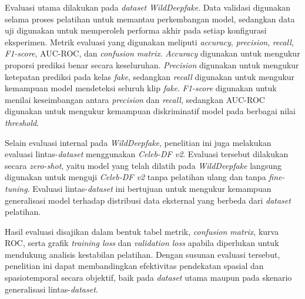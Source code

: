 Evaluasi utama dilakukan pada \textit{dataset} \textit{WildDeepfake}. Data validasi digunakan selama proses pelatihan untuk memantau perkembangan model, sedangkan data uji digunakan untuk memperoleh performa akhir pada setiap konfigurasi eksperimen. Metrik evaluasi yang digunakan meliputi \textit{accuracy}, \textit{precision}, \textit{recall}, \textit{F1-score}, AUC-ROC, dan \textit{confusion matrix}. \textit{Accuracy} digunakan untuk mengukur proporsi prediksi benar secara keseluruhan. \textit{Precision} digunakan untuk mengukur ketepatan prediksi pada kelas \textit{fake}, sedangkan \textit{recall} digunakan untuk mengukur kemampuan model mendeteksi seluruh klip \textit{fake}. \textit{F1-score} digunakan untuk menilai keseimbangan antara \textit{precision} dan \textit{recall}, sedangkan AUC-ROC digunakan untuk mengukur kemampuan diskriminatif model pada berbagai nilai \textit{threshold}. \par

Selain evaluasi internal pada \textit{WildDeepfake}, penelitian ini juga melakukan evaluasi lintas-\textit{dataset} menggunakan \textit{Celeb-DF v2}. Evaluasi tersebut dilakukan secara \textit{zero-shot}, yaitu model yang telah dilatih pada \textit{WildDeepfake} langsung digunakan untuk menguji \textit{Celeb-DF v2} tanpa pelatihan ulang dan tanpa \textit{fine-tuning}. Evaluasi lintas-\textit{dataset} ini bertujuan untuk mengukur kemampuan generalisasi model terhadap distribusi data eksternal yang berbeda dari \textit{dataset} pelatihan. \par

Hasil evaluasi disajikan dalam bentuk tabel metrik, \textit{confusion matrix}, kurva ROC, serta grafik \textit{training loss} dan \textit{validation loss} apabila diperlukan untuk mendukung analisis kestabilan pelatihan. Dengan susunan evaluasi tersebut, penelitian ini dapat membandingkan efektivitas pendekatan spasial dan spasiotemporal secara objektif, baik pada \textit{dataset} utama maupun pada skenario generalisasi lintas-\textit{dataset}. \par

